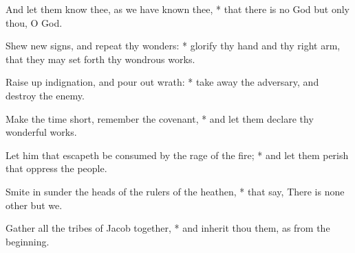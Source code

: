 \begin{multicols}{2}
And let them know thee, as we have known thee, * that there is no God but only thou, O God.\par
Shew new signs, and repeat thy wonders: * glorify thy hand and thy right arm, that they may set forth thy wondrous works.\par
Raise up indignation, and pour out wrath: * take away the adversary, and destroy the enemy.\par
Make the time short, remember the covenant, * and let them declare thy wonderful works.\par
Let him that escapeth be consumed by the rage of the fire; * and let them perish that oppress the people.\par
Smite in sunder the heads of the rulers of the heathen, * that say, There is none other but we.\par
Gather all the tribes of Jacob together, * and inherit thou them, as from the beginning.
\end{multicols}
\clearpage